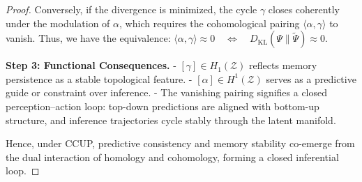 \documentclass[lettersize,journal]{IEEEtran}
\begin{document}
\begin{proof}
Conversely, if the divergence is minimized, the cycle \( \gamma \) closes coherently under the modulation of \( \alpha \), which requires the cohomological pairing \( \langle \alpha, \gamma \rangle \) to vanish. Thus, we have the equivalence:
$\langle \alpha, \gamma \rangle \approx 0 \quad \Leftrightarrow \quad D_{\mathrm{KL}}(\Psi \| \tilde{\Psi}) \approx 0$.


\textbf{Step 3: Functional Consequences.}  
- \( [\gamma] \in H_1(\mathcal{Z}) \) reflects memory persistence as a stable topological feature.
- \( [\alpha] \in H^1(\mathcal{Z}) \) serves as a predictive guide or constraint over inference.
- The vanishing pairing signifies a closed perception–action loop: top-down predictions are aligned with bottom-up structure, and inference trajectories cycle stably through the latent manifold.

Hence, under CCUP, predictive consistency and memory stability co-emerge from the dual interaction of homology and cohomology, forming a closed inferential loop.

\end{proof}
\end{document}
